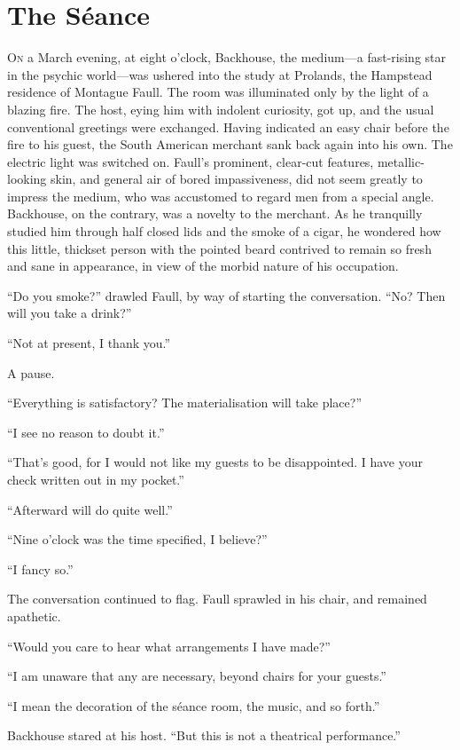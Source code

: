 \chapter{The S\'eance}

\lettrine{O}{n} a March evening, at eight o'clock, Backhouse, the medium—a fast-rising star in the psychic world—was ushered into the study at Prolands, the Hampstead residence of Montague Faull. The room was illuminated only by the light of a blazing fire. The host, eying him with indolent curiosity, got up, and the usual conventional greetings were exchanged. Having indicated an easy chair before the fire to his guest, the South American merchant sank back again into his own. The electric light was switched on. Faull's prominent, clear-cut features, metallic-looking skin, and general air of bored impassiveness, did not seem greatly to impress the medium, who was accustomed to regard men from a special angle. Backhouse, on the contrary, was a novelty to the merchant. As he tranquilly studied him through half closed lids and the smoke of a cigar, he wondered how this little, thickset person with the pointed beard contrived to remain so fresh and sane in appearance, in view of the morbid nature of his occupation.

``Do you smoke?'' drawled Faull, by way of starting the conversation. ``No? Then will you take a drink?''

``Not at present, I thank you.''

A pause.

``Everything is satisfactory? The materialisation will take place?''

``I see no reason to doubt it.''

``That's good, for I would not like my guests to be disappointed. I have your check written out in my pocket.''

``Afterward will do quite well.''

``Nine o'clock was the time specified, I believe?''

``I fancy so.''

The conversation continued to flag. Faull sprawled in his chair, and remained apathetic.

``Would you care to hear what arrangements I have made?''

``I am unaware that any are necessary, beyond chairs for your guests.''

``I mean the decoration of the séance room, the music, and so forth.''

Backhouse stared at his host. ``But this is not a theatrical performance.''

